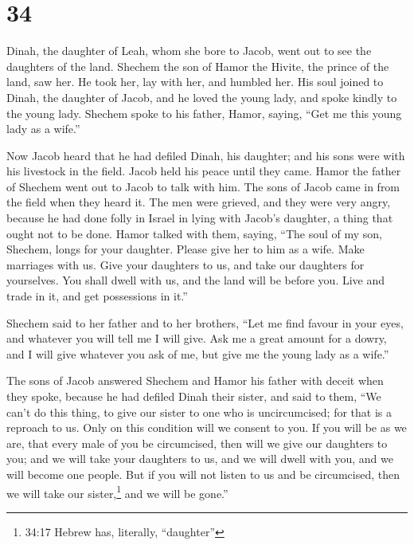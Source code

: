 \hypertarget{section-33}{%
\section{34}\label{section-33}}

 Dinah, the daughter of Leah, whom she bore to Jacob, went
out to see the daughters of the land.  Shechem the son of
Hamor the Hivite, the prince of the land, saw her. He took her, lay with
her, and humbled her.  His soul joined to Dinah, the
daughter of Jacob, and he loved the young lady, and spoke kindly to the
young lady.  Shechem spoke to his father, Hamor, saying,
``Get me this young lady as a wife.''

 Now Jacob heard that he had defiled Dinah, his daughter;
and his sons were with his livestock in the field. Jacob held his peace
until they came.  Hamor the father of Shechem went out to
Jacob to talk with him.  The sons of Jacob came in from the
field when they heard it. The men were grieved, and they were very
angry, because he had done folly in Israel in lying with Jacob's
daughter, a thing that ought not to be done.  Hamor talked
with them, saying, ``The soul of my son, Shechem, longs for your
daughter. Please give her to him as a wife.  Make marriages
with us. Give your daughters to us, and take our daughters for
yourselves.  You shall dwell with us, and the land will be
before you. Live and trade in it, and get possessions in it.''

 Shechem said to her father and to her brothers, ``Let me
find favour in your eyes, and whatever you will tell me I will give.
 Ask me a great amount for a dowry, and I will give
whatever you ask of me, but give me the young lady as a wife.''

 The sons of Jacob answered Shechem and Hamor his father
with deceit when they spoke, because he had defiled Dinah their sister,
 and said to them, ``We can't do this thing, to give our
sister to one who is uncircumcised; for that is a reproach to us.
 Only on this condition will we consent to you. If you will
be as we are, that every male of you be circumcised,  then
will we give our daughters to you; and we will take your daughters to
us, and we will dwell with you, and we will become one people.
 But if you will not listen to us and be circumcised, then
we will take our sister,\footnote{34:17 Hebrew has, literally,
  ``daughter''} and we will be gone.''


